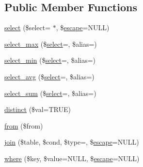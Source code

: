 \subsection*{Public Member Functions}
\begin{DoxyCompactItemize}
\item 
\mbox{\hyperlink{class_c_i___d_b__query__builder_a5e5a2d539fab07934c3e5c0699d46fef}{select}} (\$select=\textquotesingle{} $\ast$\textquotesingle{}, \$\mbox{\hyperlink{class_c_i___d_b__driver_a75beb60cdd3ee1875646d729963f5f5f}{escape}}=N\+U\+LL)
\item 
\mbox{\hyperlink{class_c_i___d_b__query__builder_a560a8240d4ac8c5343cc48370fa8b86a}{select\+\_\+max}} (\$\mbox{\hyperlink{class_c_i___d_b__query__builder_a5e5a2d539fab07934c3e5c0699d46fef}{select}}=\textquotesingle{}\textquotesingle{}, \$alias=\textquotesingle{}\textquotesingle{})
\item 
\mbox{\hyperlink{class_c_i___d_b__query__builder_a0122c0b40921d1b7d465637db4c1c6dd}{select\+\_\+min}} (\$\mbox{\hyperlink{class_c_i___d_b__query__builder_a5e5a2d539fab07934c3e5c0699d46fef}{select}}=\textquotesingle{}\textquotesingle{}, \$alias=\textquotesingle{}\textquotesingle{})
\item 
\mbox{\hyperlink{class_c_i___d_b__query__builder_aef7b0cb3f2b2a8daa251cff5b28784d6}{select\+\_\+avg}} (\$\mbox{\hyperlink{class_c_i___d_b__query__builder_a5e5a2d539fab07934c3e5c0699d46fef}{select}}=\textquotesingle{}\textquotesingle{}, \$alias=\textquotesingle{}\textquotesingle{})
\item 
\mbox{\hyperlink{class_c_i___d_b__query__builder_a498b5c912dbdd9e27cf0589fd8750afb}{select\+\_\+sum}} (\$\mbox{\hyperlink{class_c_i___d_b__query__builder_a5e5a2d539fab07934c3e5c0699d46fef}{select}}=\textquotesingle{}\textquotesingle{}, \$alias=\textquotesingle{}\textquotesingle{})
\item 
\mbox{\hyperlink{class_c_i___d_b__query__builder_aebf397d9995a29bcbdde844fafd81642}{distinct}} (\$val=T\+R\+UE)
\item 
\mbox{\hyperlink{class_c_i___d_b__query__builder_a69d7cedff660dbe0dedbef5562eacefb}{from}} (\$from)
\item 
\mbox{\hyperlink{class_c_i___d_b__query__builder_a9724fb9cda09e5318fd43fff95df455a}{join}} (\$table, \$cond, \$type=\textquotesingle{}\textquotesingle{}, \$\mbox{\hyperlink{class_c_i___d_b__driver_a75beb60cdd3ee1875646d729963f5f5f}{escape}}=N\+U\+LL)
\item 
\mbox{\hyperlink{class_c_i___d_b__query__builder_ac72023dbd400394f3a2f46c5df578713}{where}} (\$key, \$value=N\+U\+LL, \$\mbox{\hyperlink{class_c_i___d_b__driver_a75beb60cdd3ee1875646d729963f5f5f}{escape}}=N\+U\+LL)

\end{DoxyCompactItemize}
